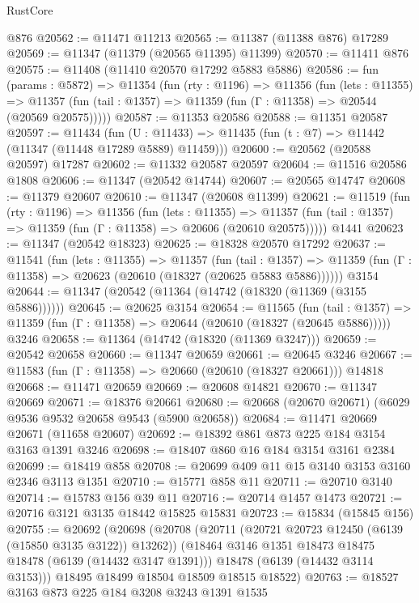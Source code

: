 \begin{lexlean}{RustCore}
\begin{coremodule}
    @876
@20562 := @11471 @11213
@20565 := @11387 (@11388 @876) @17289
@20569 := @11347 (@11379 (@20565 @11395) @11399)
@20570 := @11411 @876
@20575 := @11408 (@11410 @20570 @17292 @5883 @5886)
@20586 := fun (params : @5872) =>
  @11354
    (fun (rty : @1196) =>
    @11356
      (fun (lets : @11355) =>
      @11357 (fun (tail : @1357) => @11359 (fun (Γ : @11358) => @20544 (@20569 @20575)))))
@20587 := @11353 @20586
@20588 := @11351 @20587
@20597 := @11434
    (fun (U : @11433) => @11435 (fun (t : @7) => @11442 (@11347 (@11448 @17289 @5889) @11459)))
@20600 := @20562 (@20588 @20597) @17287
@20602 := @11332 @20587 @20597
@20604 := @11516 @20586 @1808
@20606 := @11347 (@20542 @14744)
@20607 := @20565 @14747
@20608 := @11379 @20607
@20610 := @11347 (@20608 @11399)
@20621 := @11519
    (fun (rty : @1196) =>
    @11356
      (fun (lets : @11355) =>
      @11357 (fun (tail : @1357) => @11359 (fun (Γ : @11358) => @20606 (@20610 @20575)))))
    @1441
@20623 := @11347 (@20542 @18323)
@20625 := @18328 @20570 @17292
@20637 := @11541
    (fun (lets : @11355) =>
    @11357
      (fun (tail : @1357) =>
      @11359 (fun (Γ : @11358) => @20623 (@20610 (@18327 (@20625 @5883 @5886))))))
    @3154
@20644 := @11347 (@20542 (@11364 (@14742 (@18320 (@11369 (@3155 @5886))))))
@20645 := @20625 @3154
@20654 := @11565
    (fun (tail : @1357) => @11359 (fun (Γ : @11358) => @20644 (@20610 (@18327 (@20645 @5886)))))
    @3246
@20658 := @11364 (@14742 (@18320 (@11369 @3247)))
@20659 := @20542 @20658
@20660 := @11347 @20659
@20661 := @20645 @3246
@20667 := @11583 (fun (Γ : @11358) => @20660 (@20610 (@18327 @20661))) @14818
@20668 := @11471 @20659
@20669 := @20608 @14821
@20670 := @11347 @20669
@20671 := @18376 @20661
@20680 := @20668 (@20670 @20671) (@6029 @9536 @9532 @20658 @9543 (@5900 @20658))
@20684 := @11471 @20669 @20671 (@11658 @20607)
@20692 := @18392 @861 @873 @225 @184 @3154 @3163 @1391 @3246
@20698 := @18407 @860 @16 @184 @3154 @3161 @2384
@20699 := @18419 @858
@20708 := @20699 @409 @11 @15 @3140 @3153 @3160 @2346 @3113 @1351
@20710 := @15771 @858 @11
@20711 := @20710 @3140
@20714 := @15783 @156 @39 @11
@20716 := @20714 @1457 @1473
@20721 := @20716 @3121 @3135 @18442 @15825 @15831
@20723 := @15834 (@15845 @156)
@20755 := @20692
    (@20698
      (@20708
        (@20711 (@20721 @20723 @12450 (@6139 (@15850 @3135 @3122)) @13262))
        (@18464 @3146 @1351 @18473 @18475 @18478 (@6139 (@14432 @3147 @1391)))
        @18478
        (@6139 (@14432 @3114 @3153)))
      @18495
      @18499
      @18504
      @18509
      @18515
      @18522)
@20763 := @18527 @3163 @873 @225 @184 @3208 @3243 @1391 @1535

\end{coremodule}
\end{lexlean}
